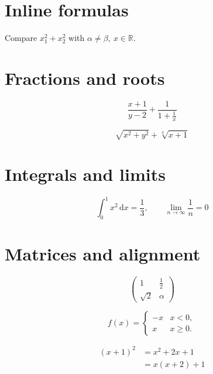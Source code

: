 \documentclass{article}
\begin{document}
\section{Inline formulas}

Compare \(x_1^2 + x_2^2\) with \(\alpha \ne \beta,\ x \in \mathbb{R}\).

\section{Fractions and roots}

\[
  \frac{x+1}{y-2} + \frac{1}{1+\frac{1}{x}}
\]

\[
  \sqrt{x^2+y^2} + \sqrt[3]{x+1}
\]

\section{Integrals and limits}

\[
  \int_0^1 x^2\,\mathrm{d}x = \frac{1}{3},
  \qquad \lim_{n\to\infty} \frac{1}{n} = 0
\]

\section{Matrices and alignment}

\[
  \begin{pmatrix}
    1 & \frac{1}{2} \\
    \sqrt{2} & \alpha
  \end{pmatrix}
\]

\[
  f(x) = \begin{cases}
    -x & x < 0, \\
     x & x \ge 0.
  \end{cases}
\]

\begin{align*}
  (x+1)^2 &= x^2 + 2x + 1 \\
          &= x(x+2) + 1
\end{align*}
\end{document}
